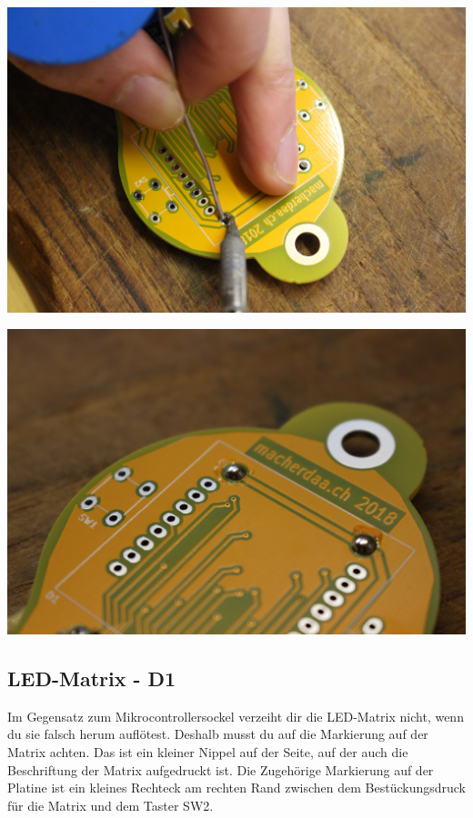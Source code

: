 \documentclass{article}
\begin{document}
\begin{minipage}[b]{0.5\textwidth}
	\includegraphics[width=\textwidth]{Bilder/IMG_5569.JPG}
	\label{fig:}
\end{minipage}
\begin{minipage}[b]{0.5\textwidth}
	\includegraphics[width=\textwidth]{Bilder/IMG_5573.JPG}
	\label{fig:}
\end{minipage}

\subsection{LED-Matrix - D1}

Im Gegensatz zum Mikrocontrollersockel verzeiht dir die LED-Matrix nicht, wenn du sie falsch herum auflötest. Deshalb musst du auf die Markierung auf der Matrix achten. Das ist ein kleiner Nippel auf der Seite, auf der auch die Beschriftung der Matrix aufgedruckt ist. Die Zugehörige Markierung auf der Platine ist ein kleines Rechteck am rechten Rand zwischen dem Bestückungsdruck für die Matrix und dem Taster SW2.
\end{document}
